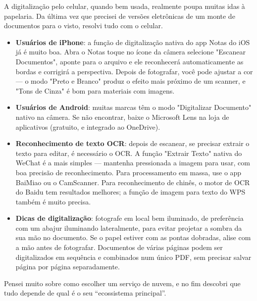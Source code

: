 
A digitalização pelo celular, quando bem usada, realmente poupa muitas idas à papelaria. Da última vez que precisei de versões eletrônicas de um monte de documentos para o visto, resolvi tudo com o celular.

\begin{itemize}
  \item \textbf{Usuários de iPhone}: a função de digitalização nativa do app Notas do iOS já é muito boa. Abra o Notas toque no ícone da câmera selecione "Escanear Documentos", aponte para o arquivo e ele reconhecerá automaticamente as bordas e corrigirá a perspectiva. Depois de fotografar, você pode ajustar a cor — o modo "Preto e Branco" produz o efeito mais próximo de um scanner, e "Tons de Cinza" é bom para materiais com imagens.
  \item \textbf{Usuários de Android}: muitas marcas têm o modo "Digitalizar Documento" nativo na câmera. Se não encontrar, baixe o Microsoft Lens na loja de aplicativos (gratuito, e integrado ao OneDrive).
  \item \textbf{Reconhecimento de texto OCR}: depois de escanear, se precisar extrair o texto para editar, é necessário o OCR. A função "Extrair Texto" nativa do WeChat é a mais simples — mantenha pressionada a imagem para usar, com boa precisão de reconhecimento. Para processamento em massa, use o app BaiMiao ou o CamScanner. Para reconhecimento de chinês, o motor de OCR do Baidu tem resultados melhores; a função de imagem para texto do WPS também é muito precisa.
  \item \textbf{Dicas de digitalização}: fotografe em local bem iluminado, de preferência com um abajur iluminando lateralmente, para evitar projetar a sombra da sua mão no documento. Se o papel estiver com as pontas dobradas, alise com a mão antes de fotografar. Documentos de várias páginas podem ser digitalizados em sequência e combinados num único PDF, sem precisar salvar página por página separadamente.
\end{itemize}


Pensei muito sobre como escolher um serviço de nuvem, e no fim descobri que tudo depende de qual é o seu “ecossistema principal”.

